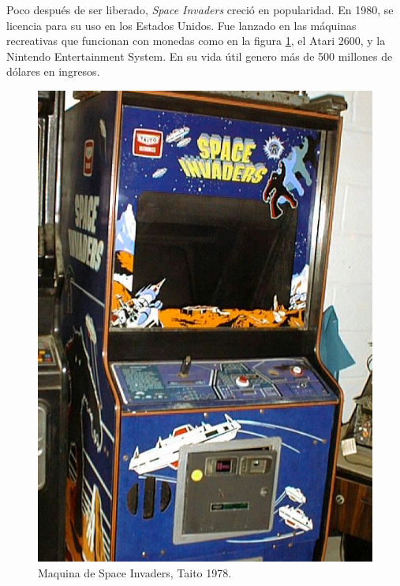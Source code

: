 \documentclass[a4paper]{article} %
\begin{document}
Poco después de ser liberado, \emph{Space Invaders} creció en popularidad. En 1980, se licencia para su uso en los Estados Unidos. Fue lanzado en las máquinas recreativas que funcionan con monedas como en la figura \ref{fig:ejemplo}, el Atari 2600, y la Nintendo Entertainment System. En su vida útil genero más de 500 millones de dólares en ingresos.\\
\begin{figure}
  \centering
    \includegraphics[scale=0.5]{images/machine}
  \caption{Maquina de Space Invaders, Taito 1978.}
  \label{fig:ejemplo}
\end{figure}
\end{document}

